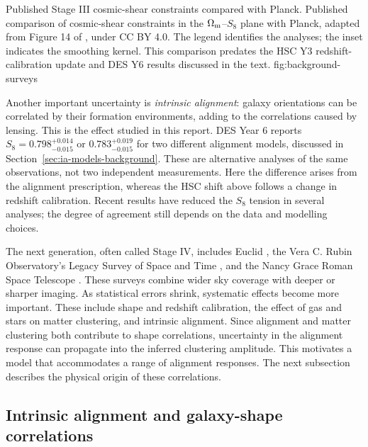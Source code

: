   {Published Stage III cosmic-shear constraints compared with Planck.}
  {Published comparison of cosmic-shear constraints in the
   $\Omega_{\rm m}$--$S_8$ plane with Planck, adapted from Figure 14 of
   \citet{2025A&A...703A.158W}, under CC BY 4.0. The legend identifies the
   analyses; the inset indicates the smoothing kernel. This comparison
   predates the HSC Y3 redshift-calibration update and DES Y6 results
   discussed in the text.}
  {fig:background-surveys}

Another important uncertainty is \emph{intrinsic alignment}: galaxy
orientations can be correlated by their formation environments, adding to
the correlations caused by lensing. This is the effect studied in this
report. DES Year 6 \citep{2026arXiv260210065D} reports
$S_8=0.798^{+0.014}_{-0.015}$ or $0.783^{+0.019}_{-0.015}$ for two different
alignment models, discussed in Section~\ref{sec:ia-models-background}.
These are alternative analyses of the same observations, not two independent
measurements. Here the difference arises from the alignment prescription,
whereas the HSC shift above follows a change in redshift calibration.
Recent results have reduced the $S_8$ tension in several analyses; the
degree of agreement still depends on the data and modelling choices.

The next generation, often called Stage IV, includes Euclid
\citep{2025A&A...697A...1E}, the Vera C. Rubin Observatory's Legacy Survey
of Space and Time \citep{2019ApJ...873..111I}, and the Nancy Grace Roman
Space Telescope \citep{2021MNRAS.507.1746E}. These surveys combine wider sky coverage with deeper or sharper imaging.
As statistical errors shrink, systematic effects become more important.
These include shape and redshift calibration, the effect of gas and stars
on matter clustering, and intrinsic alignment. Since alignment and matter
clustering both contribute to shape correlations, uncertainty in the
alignment response can propagate into the inferred clustering amplitude.
This motivates a model that accommodates a range of alignment responses.
The next subsection describes the physical origin of these correlations.

\subsection{Intrinsic alignment and galaxy-shape correlations}
\label{sec:ia-background}

